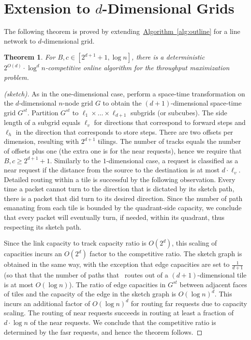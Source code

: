 \documentclass[11pt]{article}
\newtheorem{theorem}{Theorem}
\newcommand{\namedref}[2]{\hyperref[#2]{#1~\ref*{#2}}}
\newcommand{\Algref}[1]{\namedref{Algorithm}{#1}}
\newcommand{\route}{\text{\sc{ipp}}\xspace}
\newcommand{\IPP}{\route}
\newenvironment{proof sketch}[1]{\noindent {\emph{Proof sketch of #1:}}}{\hfill \qed}
\newcommand{\Gst}{G^{st}}
\newcommand{\Hl}{\ell_h}
\newcommand{\vl}{\ell_v}
\begin{document}
\section{Extension to $d$-Dimensional Grids}\label{sec:d dim}

The following theorem is proved by extending~\Algref{alg:outline} for a
line network to $d$-dimensional grid.
\begin{theorem}\label{thm:d dim}
  For $B,c \in [2^{d+1}+1,\log n]$, there is a deterministic $2^{O(d)}\cdot \log^d
  n$-competitive online algorithm for the throughput maximization problem.
\end{theorem}
\begin{proof}[(sketch)]
  As in the one-dimensional case, perform a space-time transformation on the
  $d$-dimensional $n$-node grid $G$ to obtain the $(d+1)$-dimensional space-time grid
  $G^{st}$. Partition $G^{st}$ to $\ell_1\times\ldots \times\ell_{d+1}$ subgrids (or
  subcubes). The side length of a subgrid equals $\vl$ for directions that correspond
  to forward steps and $\Hl$ in the direction that corresponds to store steps.  There
  are two offsets per dimension, resulting with $2^{d+1}$ tilings. The number of
  tracks equals the number of offsets plus one (the extra one is for the near requests), hence we
  require that $B,c \geq 2^{d+1}+1$.  Similarly to the $1$-dimensional case, a
  request is classified as a near request if the distance from the source to the
  destination is at most $d\cdot \vl$.  Detailed routing within a tile is successful
  by the following observation. Every time a packet cannot turn to the direction that
  is dictated by its sketch path, there is a packet that did turn to its desired direction.
  Since the number of path emanating from each tile is bounded by the quadrant-side
  capacity, we conclude that every packet will eventually turn, if needed, within its
  quadrant, thus respecting its sketch path.

  Since the link capacity to track capacity ratio is $O(2^d)$, this scaling of
  capacities incurs an  $O(2^d)$ factor to the competitive ratio.  The
  sketch graph is obtained in the same way, with the exception that edge capacities
  are set to $\frac 1{d+1}$ (so that that the number of paths that \IPP\ routes out
  of a $(d+1)$-dimensional tile is at most $O(\log n)$). The ratio of edge capacities
  in $\Gst$ between adjacent faces of tiles and the capacity of the edge in the
  sketch graph is $O(\log n)^d$. This incurs an additional factor of $O(\log n)^d$
  for routing far requests due to capacity scaling.
The routing of near requests succeeds in routing at least a fraction of $d\cdot \log
n$ of the near requests. We conclude that the competitive ratio is determined by the
fasr requests, and hence the theorem follows.
\end{proof}
\end{document}
